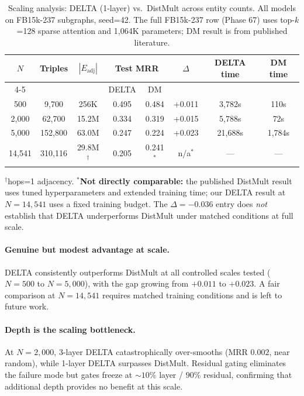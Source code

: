 \documentclass{article}
\begin{document}
\begin{table}[h]
\centering
\caption{Scaling analysis: DELTA (1-layer) vs.\ DistMult across entity counts. All models on FB15k-237 subgraphs, seed=42. The full FB15k-237 row (Phase 67) uses top-$k$=128 sparse attention and 1,064K parameters; DM result is from published literature.}
\label{tab:scaling}
\begin{tabular}{@{}cccccccc@{}}
\toprule
\textbf{$N$} & \textbf{Triples} & \textbf{$|E_{\text{adj}}|$} & \multicolumn{2}{c}{\textbf{Test MRR}} & \textbf{$\Delta$} & \textbf{DELTA time} & \textbf{DM time} \\
\cmidrule(lr){4-5}
& & & DELTA & DM & & & \\
\midrule
500 & 9,700 & 256K & 0.495 & 0.484 & +0.011 & 3,782s & 110s \\
2,000 & 62,700 & 15.2M & 0.334 & 0.319 & +0.015 & 5,788s & 72s \\
5,000 & 152,800 & 63.0M & 0.247 & 0.224 & +0.023 & 21,688s & 1,784s \\
14,541 & 310,116 & 29.8M$^\dagger$ & 0.205 & 0.241$^*$ & n/a$^*$ & --- & --- \\
\bottomrule
\end{tabular}
\vspace{1pt}
{\small $^\dagger$hops=1 adjacency. $^*$\textbf{Not directly comparable:} the published DistMult result~\cite{yang2015embedding} uses tuned hyperparameters and extended training time; our DELTA result at $N{=}14{,}541$ uses a fixed training budget. The $\Delta{=}{-0.036}$ entry does \emph{not} establish that DELTA underperforms DistMult under matched conditions at full scale.}
\end{table}

\paragraph{Genuine but modest advantage at scale.}
DELTA consistently outperforms DistMult at all controlled scales tested ($N{=}500$ to $N{=}5{,}000$), with the gap growing from $+0.011$ to $+0.023$. A fair comparison at $N{=}14{,}541$ requires matched training conditions and is left to future work.

\paragraph{Depth is the scaling bottleneck.}
At $N{=}2{,}000$, 3-layer DELTA catastrophically over-smooths (MRR $0.002$, near random), while 1-layer DELTA surpasses DistMult. Residual gating eliminates the failure mode but gates freeze at ${\sim}10\%$ layer / $90\%$ residual, confirming that additional depth provides no benefit at this scale.
\end{document}
